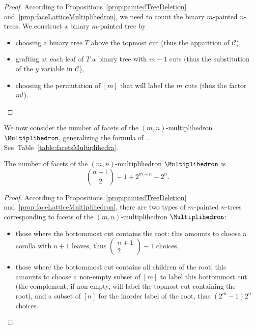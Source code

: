 \documentclass[AHL,Unicode,longabstracts,published]{cedram}
\newcommand{\CGF}{\mathcal{C}}
\begin{document}
\begin{proof}
According to Propositions~\ref{prop:paintedTreeDeletion} and~\ref{prop:faceLatticeMultiplihedron}, we need to count the binary $m$-painted $n$-trees. We construct a binary $m$-painted tree by
\begin{itemize}
\item choosing a binary tree $T$ above the topmost cut (thus the apparition of $\CGF$),
\item grafting at each leaf of $T$ a binary tree with $m-1$ cuts (thus the substitution of the $y$ variable in $\CGF$),
\item choosing the permutation of $[m]$ that will label the $m$ cuts (thus the factor $m!$).
\qedhere
\end{itemize}
\end{proof}

We now consider the number of facets of the $(m,n)$-multiplihedron $\Multiplihedron$, generalizing the formula of~\cite[Thm.~2.4]{Forcey-multiplihedra}. See~Table~\ref{table:facetsMultiplihedra}.

\begin{prop}\label{prop:numberFacetsMultiplihedra}
The number of facets of the $(m,n)$-multiplihedron \linebreak $\Multiplihedron$ is
\[
\textstyle{ \binom{n+1}{2} - 1 + 2^{m+n} - 2^n.}
\]
\end{prop}

\begin{proof}
According to Propositions~\ref{prop:paintedTreeDeletion} and~\ref{prop:faceLatticeMultiplihedron}, there are two types of $m$-painted $n$-trees corresponding to facets of the $(m,n)$-multiplihedron $\Multiplihedron$:
\begin{itemize}
\item those where the bottommost cut contains the root: this amounts to choose a corolla with $n+1$ leaves, thus
$(\begin{smallmatrix}
n+1\\ 2
\end{smallmatrix})-1$ choices,
\item those where the bottommost cut contains all children of the root: this amounts to choose a non-empty subset of $[m]$ to label this bottommost cut (the complement, if non-empty, will label the topmost cut containing the root), and a subset of $[n]$ for the inorder label of the root, thus $(2^m-1) 2^n$ choices.
\qedhere
\end{itemize}
\end{proof}
\end{document}
